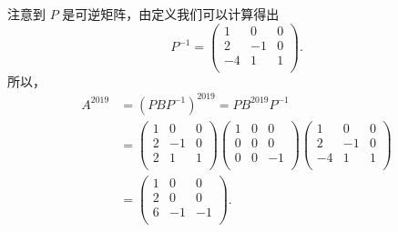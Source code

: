\begin{enumerate}[1~]
\begin{enumerate}[1.~]
\begin{solution}
注意到 $P$ 是可逆矩阵，由定义我们可以计算得出
\[
P^{-1}=\left( \begin{matrix}
	1&		0&		0\\
	2&		-1&		0\\
	-4&		1&		1\\
\end{matrix} \right) .
\]
所以，
\begin{align*}
A^{2019}&=(PBP^{-1})^{2019}=PB^{2019}P^{-1}\\
&=\left( \begin{matrix}
	1&		0&		0\\
	2&		-1&		0\\
	2&		1&		1\\
\end{matrix} \right) \left( \begin{matrix}
	1&		0&		0\\
	0&		0&		0\\
	0&		0&		-1\\
\end{matrix} \right) \left( \begin{matrix}
	1&		0&		0\\
	2&		-1&		0\\
	-4&		1&		1\\
\end{matrix} \right)\\
&=\left( \begin{matrix}
	1&		0&		0\\
	2&		0&		0\\
	6&		-1&		-1\\
\end{matrix} \right).
\end{align*}
\end{solution}


\end{enumerate}
\end{enumerate}
